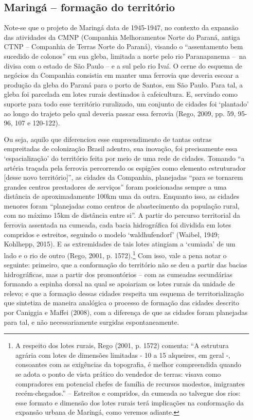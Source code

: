 \documentclass[12pt, a4paper]{book} %
\begin{document}
                \subsection*{Maringá – formação do território}

        Note-se que o projeto de Maringá data de 1945-1947, no contexto da expansão das atividades da CMNP (Companhia Melhoramentos Norte do Paraná, antiga CTNP – Companhia de Terras Norte do Paraná), visando o ``assentamento bem sucedido de colonos'' em sua gleba, limitada a norte pelo rio Paranapanema – na divisa com o estado de São Paulo – e a sul pelo rio Ivaí. O cerne do esquema de negócios da Companhia consistia em manter uma ferrovia que deveria escoar a produção da gleba do Paraná para o porto de Santos, em São Paulo. Para tal, a gleba foi parcelada em lotes rurais destinados à cafeicultura. E, servindo como suporte para todo esse território ruralizado, um conjunto de cidades foi `plantado' ao longo do trajeto pelo qual deveria passar essa ferrovia (Rego, 2009, pp. 59, 95-96, 107 e 120-122). 

        Ou seja, aquilo que diferenciou esse empreendimento de tantas outras empreitadas de colonização Brasil adentro, sua inovação, foi precisamente essa `espacialização' do território feita por meio de uma rede de cidades. Tomando ``a artéria traçada pela ferrovia percorrendo os espigões como elemento estruturador [desse novo território]'', as cidades da Companhia, planejadas ``para se tornarem grandes centros prestadores de serviços'' foram posicionadas sempre a uma distância de aproximadamente 100km uma da outra. Enquanto isso, as cidades menores foram ``planejadas como centros de abastecimento da população rural, com no máximo 15km de distância entre si''. A partir do percurso territorial da ferrovia assentada na cumeada, cada bacia hidrográfica foi dividida em lotes compridos e estreitos, seguindo o modelo `waldhufendorf' (Waibel, 1949; Kohlhepp, 2015). E as extremidades de tais lotes atingiam a `cumiada' de um lado e o rio de outro (Rego, 2001, p. 1572).\footnote[93]{ A respeito dos lotes rurais, Rego (2001, p. 1572) comenta: ``A estrutura agrária com lotes de dimensões limitadas - 10 a 15 alqueires, em geral -, consoantes com as exigências da topografia, é melhor compreendida quando se adota o ponto de vista prático do vendedor de terras: visava como compradores em potencial chefes de família de recursos modestos, imigrantes recém-chegados.'' – Estreitos e compridos, da cumeada ao talvegue dos rios: esse formato e dimensão dos lotes rurais terá implicações na conformação da expansão urbana de Maringá, como veremos adiante.} Com isso, vale a pena notar o seguinte: primeiro, que a conformação do território não se deu a partir das bacias hidrográficas, mas a partir dos promontórios – com as cumeadas secundárias formando a espinha dorsal na qual se apoiariam os lotes rurais da unidade de relevo; e que a formação dessas cidades respeita um esquema de territorialização que sintetiza de maneira analógica o processo de formação das cidades descrito por Caniggia e Maffei (2008), com a diferença de que as cidades foram planejadas para tal, e não necessariamente surgidas espontaneamente.
\end{document}
